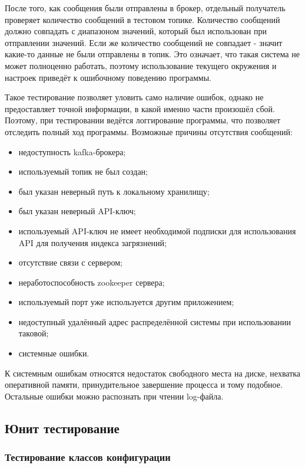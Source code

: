 После того, как сообщения были отправлены в брокер, отдельный получатель проверяет количество сообщений в тестовом топике.
Количество сообщений должно совпадать с диапазоном значений, который был использован при отправлении значений.
Если же количество сообщений не совпадает - значит какие-то данные не были отправлены в топик.
Это означает, что такая система не может полноценно работать, поэтому использование текущего окружения и настроек приведёт к ошибочному поведению программы.

Такое тестирование позволяет уловить само наличие ошибок, однако не предоставляет точной информации, в какой именно части произошёл сбой.
Поэтому, при тестировании ведётся логгирование программы, что позволяет отследить полный ход программы.
Возможные причины отсутствия сообщений:
\begin{itemize}
    \item недоступность kafka-брокера;
    \item используемый топик не был создан;
    \item был указан неверный путь к локальному хранилищу;
    \item был указан неверный API-ключ;
    \item используемый API-ключ не имеет необходимой подписки для использования API для получения индекса загрязнений;
    \item отсутствие связи с сервером;
    \item неработоспособность zookeeper сервера;
    \item используемый порт уже используется другим приложением;
    \item недоступный удалённый адрес распределённой системы при использовании таковой;
    \item системные ошибки.
\end{itemize}

К системным ошибкам относятся недостаток свободного места на диске, нехватка оперативной памяти, принудительное завершение процесса и тому подобное.
Остальные ошибки можно распознать при чтении log-файла.


\subsection{Юнит тестирование}

\subsubsection{Тестирование классов конфигурации}

